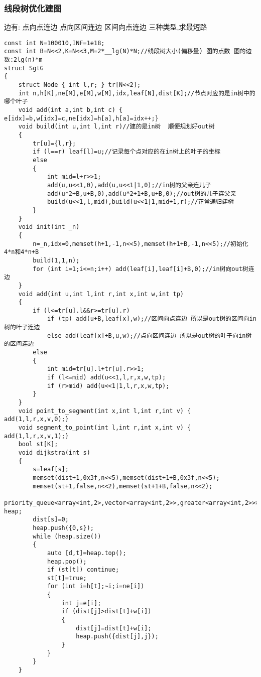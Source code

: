 \documentclass[a4paper]{ctexart}
\begin{document}
\subsubsection{线段树优化建图}

边有: \quad 点向点连边 \quad 点向区间连边 \quad 区间向点连边 \quad 三种类型,求最短路


\begin{lstlisting}
const int N=100010,INF=1e18;
const int B=N<<2,K=N<<3,M=2*__lg(N)*N;//线段树大小(偏移量) 图的点数 图的边数:2lg(n)*m
struct SgtG
{
    struct Node { int l,r; } tr[N<<2];
    int n,h[K],ne[M],e[M],w[M],idx,leaf[N],dist[K];//节点对应的是in树中的哪个叶子
    void add(int a,int b,int c) { e[idx]=b,w[idx]=c,ne[idx]=h[a],h[a]=idx++;}
    void build(int u,int l,int r)//建的是in树  顺便规划好out树
    {
        tr[u]={l,r};
        if (l==r) leaf[l]=u;//记录每个点对应的在in树上的叶子的坐标
        else
        {
            int mid=l+r>>1;
            add(u,u<<1,0),add(u,u<<1|1,0);//in树的父亲连儿子
            add(u*2+B,u+B,0),add(u*2+1+B,u+B,0);//out树的儿子连父亲
            build(u<<1,l,mid),build(u<<1|1,mid+1,r);//正常递归建树
        }
    }
    void init(int _n)
    {
        n=_n,idx=0,memset(h+1,-1,n<<5),memset(h+1+B,-1,n<<5);//初始化4*n和4*n+B
        build(1,1,n);
        for (int i=1;i<=n;i++) add(leaf[i],leaf[i]+B,0);//in树向out树连边
    }
    void add(int u,int l,int r,int x,int w,int tp)
    {
        if (l<=tr[u].l&&r>=tr[u].r)
            if (tp) add(u+B,leaf[x],w);//区间向点连边 所以是out树的区间向in树的叶子连边
            else add(leaf[x]+B,u,w);//点向区间连边 所以是out树的叶子向in树的区间连边
        else
        {
            int mid=tr[u].l+tr[u].r>>1;
            if (l<=mid) add(u<<1,l,r,x,w,tp);
            if (r>mid) add(u<<1|1,l,r,x,w,tp);
        }
    }
    void point_to_segment(int x,int l,int r,int v) { add(1,l,r,x,v,0);}
    void segment_to_point(int l,int r,int x,int v) { add(1,l,r,x,v,1);}
    bool st[K];
    void dijkstra(int s)
    {
        s=leaf[s];
        memset(dist+1,0x3f,n<<5),memset(dist+1+B,0x3f,n<<5);
        memset(st+1,false,n<<2),memset(st+1+B,false,n<<2);
        priority_queue<array<int,2>,vector<array<int,2>>,greater<array<int,2>>> heap;
        dist[s]=0;
        heap.push({0,s});
        while (heap.size())
        {   
            auto [d,t]=heap.top();
            heap.pop();
            if (st[t]) continue;
            st[t]=true;
            for (int i=h[t];~i;i=ne[i])
            {
                int j=e[i];
                if (dist[j]>dist[t]+w[i])
                {
                    dist[j]=dist[t]+w[i];
                    heap.push({dist[j],j});
                }
            }
        }
    }
    

\end{lstlisting}
\end{document}
